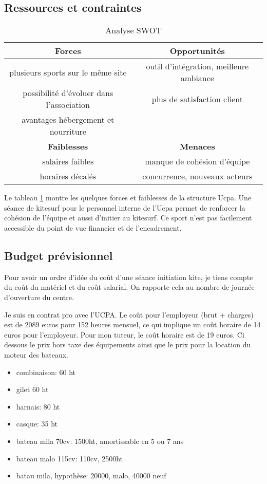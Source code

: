 \documentclass[11pt,a4paper]{report}
\begin{document}
\subsection{Ressources et contraintes}
\begin{table}
\centering
\begin{tabular}{|c|c|}
        \hline
        \textbf{Forces}                          & \textbf{Opportunités} \\ 
        \hline
        plusieurs sports sur le m\^eme site      &  outil d'intégration, meilleure ambiance\\
        possibilité d'évoluer dans l'association & plus de satisfaction client  \\
        avantages hébergement et nourriture      &                              \\
        \hline
        \textbf{Faiblesses}                      &  \textbf{Menaces} \\ 
        \hline
        salaires faibles                         & manque de cohésion d'équipe \\
        horaires décalés                         & concurrence, nouveaux acteurs   \\
        \hline
\end{tabular}
\caption{Analyse SWOT\label{swot}}
\end{table}
Le tableau \ref{swot} montre les quelques forces et faiblesses de la structure Ucpa.
Une séance de kitesurf pour le personnel interne de l'Ucpa 
permet de renforcer la cohésion de l'équipe et aussi d'initier au kitesurf.
Ce sport n'est pas facilement  accessible du point de vue financier et
de l'encadrement.
\subsection{Budget prévisionnel}

Pour avoir un ordre d'idée du coût d'une séance initiation kite, je
tiens compte du co\^ut du matériel et du co\^ut salarial. On rapporte 
cela au nombre de journée d'ouverture du centre.

Je suis en contrat pro avec l'UCPA. Le coût pour l'employeur (brut + charges) est
de 2089 euros pour 152 heures mensuel, 
ce qui implique un coût horaire de 14 euros pour l'employeur.
Pour mon tuteur, le coût horaire est de 19 euros.
Ci dessous le prix hors taxe des équipements ainsi
que le prix pour la location du moteur des bateaux.
\begin{itemize}
\item combinaison: 60 ht
\item gilet 60 ht
\item harnais: 80 ht
\item casque: 35 ht
\item bateau mila 70cv: 1500ht, amortissable en 5 ou 7 ans
\item bateau malo 115cv: 110cv, 2500ht
\item batau mila, hypothèse: 20000, malo, 40000 neuf
\end{itemize}
\end{document}
